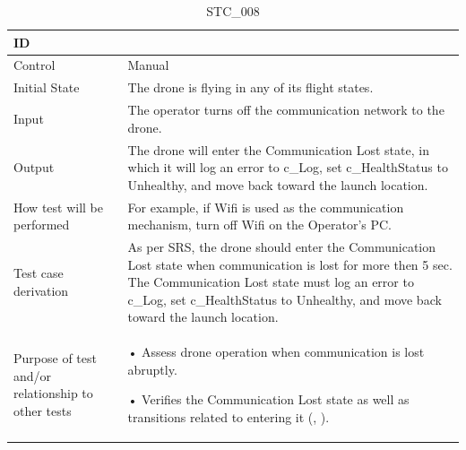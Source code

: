 \documentclass[12pt, titlepage]{article}
\begin{document}
\begin{table}[!h]
\begin{center}
\caption {STC\_008}
\label{tab:STC_008}
\begin{tabular}{ | m{3.2cm} | m{12.2cm} | } 
\hline
ID & \nameref{tab:STC_008} \\ 
\hline
Control & Manual \\ 
\hline
Initial State &  The drone is flying in any of its flight states. \\ 
\hline
Input & The operator turns off the communication network to the drone. \\ 
\hline
Output & The drone will enter the Communication Lost state, in which it will log an error to c_Log, set c_HealthStatus to Unhealthy, and move back toward the launch location. \\ 
\hline
How test will be performed & For example, if Wifi is used as the communication mechanism, turn off Wifi on the Operator's PC. \\ 
\hline
Test case derivation & As per SRS, the drone should enter the Communication Lost state when communication is lost for more then 5 sec. The Communication Lost state must log an error to c_Log, set c_HealthStatus to Unhealthy, and move back toward the launch location. \\ 
\hline
Purpose of test and/or relationship to other tests & 
• Assess drone operation when communication is lost abruptly.

• Verifies the Communication Lost state as well as transitions related to entering it (\nameref{STA_010}, \nameref{TRANS_010}).  
\\ 
\hline
\end{tabular}
\end{center}
\end{table}
\end{document}
